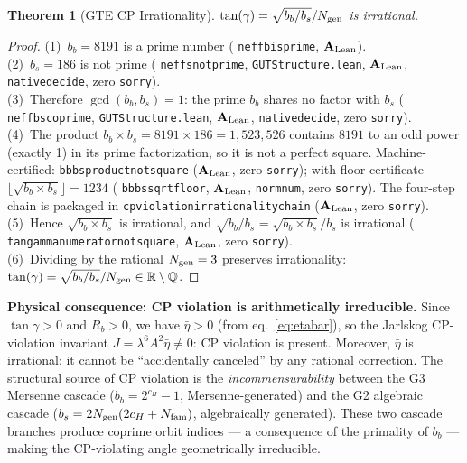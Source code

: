 \documentclass[11pt]{article}
\newtheorem{theorem}{Theorem}[section]
\theoremstyle{remark}
\newcommand{\Ngen}{N_{\rm gen}}
\newcommand{\Nfam}{N_{\rm fam}}
\newcommand{\cH}{c_H}
\newcommand{\lean}[1]{%
  \penalty-100
  \begingroup\def\_{\textunderscore\allowbreak}\texttt{#1}\endgroup}
\newcommand{\lam}{\lambda}
\newcommand{\Ebar}{\bar{\eta}}
\newcommand{\bs}{b_s}
\newcommand{\bb}{b_b}
\newcommand{\Rb}{R_b}
\newcommand{\CatAL}{\ensuremath{\textbf{A}_{\rm Lean}}}
\begin{document}
\medskip

\begin{theorem}[GTE CP Irrationality]\label{thm:cp_irrationality}
$\tan(\gamma) = \sqrt{\bb/\bs}/\Ngen$ is irrational.
\end{theorem}
\begin{proof}
(1)~$\bb = 8191$ is a prime number (\lean{neff\_b\_is\_prime}, $\CatAL$).\\
(2)~$\bs = 186$ is not prime (\lean{neff\_s\_not\_prime},
    \texttt{GUTStructure.lean}, $\CatAL$, \lean{native\_decide}, zero \texttt{sorry}).\\
(3)~Therefore $\gcd(\bb,\bs) = 1$: the prime $\bb$ shares no factor with $\bs$
    (\lean{neff\_b\_s\_coprime}, \texttt{GUTStructure.lean}, $\CatAL$,
    \lean{native\_decide}, zero \texttt{sorry}).\\
(4)~The product $\bb\times\bs = 8191\times 186 = 1{,}523{,}526$ contains $8191$ to an
    odd power (exactly 1) in its prime factorization, so it is not a perfect square.
    Machine-certified: \lean{bb\_bs\_product\_not\_square} ($\CatAL$, zero \texttt{sorry});
    with floor certificate $\lfloor\sqrt{\bb\times\bs}\rfloor = 1234$
    (\lean{bb\_bs\_sqrt\_floor}, $\CatAL$, \lean{norm\_num}, zero \texttt{sorry}).
    The four-step chain is packaged in \lean{cp\_violation\_irrationality\_chain}
    ($\CatAL$, zero \texttt{sorry}).\\
(5)~Hence $\sqrt{\bb\times\bs}$ is irrational, and
    $\sqrt{\bb/\bs} = \sqrt{\bb\times\bs}/\bs$ is irrational
    (\lean{tan\_gamma\_numerator\_not\_square}, $\CatAL$,
    zero \texttt{sorry}).\\
(6)~Dividing by the rational $\Ngen = 3$ preserves irrationality:
    $\tan(\gamma) = \sqrt{\bb/\bs}/\Ngen \in \mathbb{R}\setminus\mathbb{Q}$.
\end{proof}

\textbf{Physical consequence: CP violation is arithmetically irreducible.}
Since $\tan\gamma > 0$ and $\Rb > 0$, we have $\Ebar > 0$
(from eq.~\eqref{eq:etabar}), so the Jarlskog CP-violation invariant
$J = \lam^6 A^2\Ebar \neq 0$: CP violation is present.
Moreover, $\Ebar$ is irrational: it cannot be ``accidentally canceled'' by any
rational correction.
The structural source of CP violation is the \emph{incommensurability} between the
G3 Mersenne cascade ($\bb = 2^{\cH}-1$, Mersenne-generated) and the G2 algebraic
cascade ($\bs = 2\Ngen(2\cH+\Nfam)$, algebraically generated).
These two cascade branches produce coprime orbit indices --- a consequence of the
primality of $\bb$ --- making the CP-violating angle geometrically irreducible.
\end{document}
